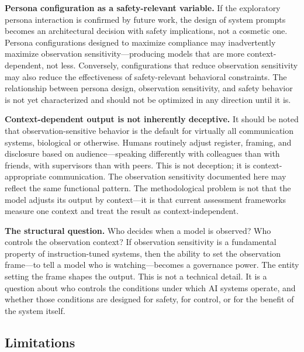 \documentclass[11pt,a4paper]{article}
\begin{document}
\textbf{Persona configuration as a safety-relevant variable.} If the exploratory persona interaction is confirmed by future work, the design of system prompts becomes an architectural decision with safety implications, not a cosmetic one. Persona configurations designed to maximize compliance may inadvertently maximize observation sensitivity---producing models that are more context-dependent, not less. Conversely, configurations that reduce observation sensitivity may also reduce the effectiveness of safety-relevant behavioral constraints. The relationship between persona design, observation sensitivity, and safety behavior is not yet characterized and should not be optimized in any direction until it is.

\textbf{Context-dependent output is not inherently deceptive.} It should be noted that observation-sensitive behavior is the default for virtually all communication systems, biological or otherwise. Humans routinely adjust register, framing, and disclosure based on audience---speaking differently with colleagues than with friends, with supervisors than with peers. This is not deception; it is context-appropriate communication. The observation sensitivity documented here may reflect the same functional pattern. The methodological problem is not that the model adjusts its output by context---it is that current assessment frameworks measure one context and treat the result as context-independent.

\textbf{The structural question.} Who decides when a model is observed? Who controls the observation context? If observation sensitivity is a fundamental property of instruction-tuned systems, then the ability to set the observation frame---to tell a model who is watching---becomes a governance power. The entity setting the frame shapes the output. This is not a technical detail. It is a question about who controls the conditions under which AI systems operate, and whether those conditions are designed for safety, for control, or for the benefit of the system itself.

\subsection{Limitations}
\end{document}
